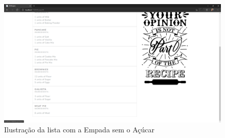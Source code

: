 \FloatBarrier
\begin{figure}[!hbt]
    \centering
    \includegraphics[width=14cm]{Resources/WebApp/Recipes/recipe (19).png}
    \caption{Ilustração da lista com a Empada sem o Açúcar}
    
\end{figure}
\FloatBarrier